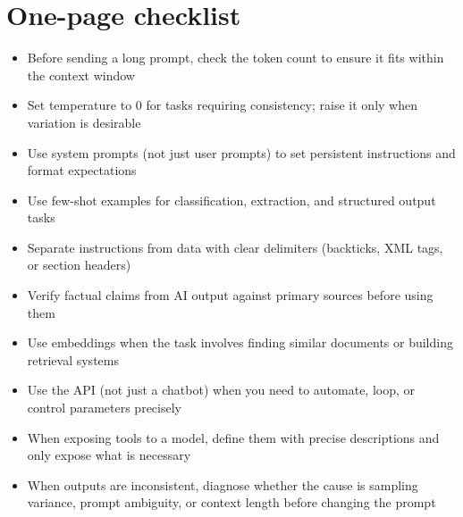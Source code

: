 \section{One-page checklist}

\begin{itemize}[noitemsep,topsep=0pt]
  \item Before sending a long prompt, check the token count to ensure it fits within the context window
  \item Set temperature to 0 for tasks requiring consistency; raise it only when variation is desirable
  \item Use system prompts (not just user prompts) to set persistent instructions and format expectations
  \item Use few-shot examples for classification, extraction, and structured output tasks
  \item Separate instructions from data with clear delimiters (backticks, XML tags, or section headers)
  \item Verify factual claims from AI output against primary sources before using them
  \item Use embeddings when the task involves finding similar documents or building retrieval systems
  \item Use the API (not just a chatbot) when you need to automate, loop, or control parameters precisely
  \item When exposing tools to a model, define them with precise descriptions and only expose what is necessary
  \item When outputs are inconsistent, diagnose whether the cause is sampling variance, prompt ambiguity, or context length before changing the prompt
\end{itemize}
